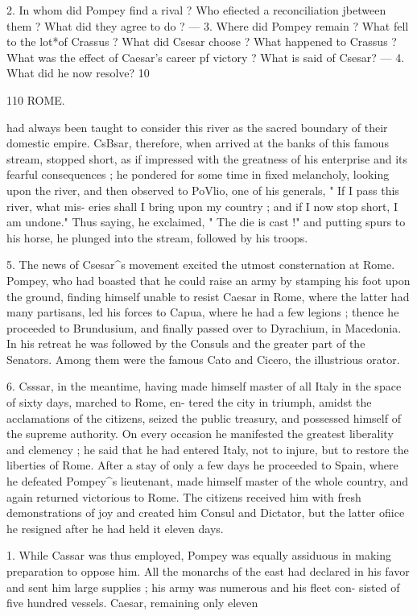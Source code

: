 \documentclass[openany,a4paper]{memoir}
\begin{document}
2. In whom did Pompey find a rival ? Who efiected a reconciliation 
jbetween them ? What did they agree to do ? — 3. Where did Pompey 
remain ? What fell to the lot*of Crassus ? What did Csesar choose ? 
What happened to Crassus ? What was the effect of Caesar's career 
pf victory ? What is said of Csesar? — 4. What did he now resolve? 
10 



110 ROME. 

had always been taught to consider this river as the sacred 
boundary of their domestic empire. CsBsar, therefore, when 
arrived at the banks of this famous stream, stopped short, as 
if impressed with the greatness of his enterprise and its 
fearful consequences ; he pondered for some time in fixed 
melancholy, looking upon the river, and then observed to 
PoVlio, one of his generals, " If I pass this river, what mis- 
eries shall I bring upon my country ; and if I now stop 
short, I am undone." Thus saying, he exclaimed, " The die 
is cast !" and putting spurs to his horse, he plunged into the 
stream, followed by his troops. 

5. The news of Csesar^s movement excited the utmost 
consternation at Rome. Pompey, who had boasted that he 
could raise an army by stamping his foot upon the ground, 
finding himself unable to resist Caesar in Rome, where the 
latter had many partisans, led his forces to Capua, where he 
had a few legions ; thence he proceeded to Brundusium, and 
finally passed over to Dyrachium, in Macedonia. In his 
retreat he was followed by the Consuls and the greater part 
of the Senators. Among them were the famous Cato and 
Cicero, the illustrious orator. 

6. Csssar, in the meantime, having made himself master 
of all Italy in the space of sixty days, marched to Rome, en- 
tered the city in triumph, amidst the acclamations of the 
citizens, seized the public treasury, and possessed himself of 
the supreme authority. On every occasion he manifested the 
greatest liberality and clemency ; he said that he had entered 
Italy, not to injure, but to restore the liberties of Rome. 
After a stay of only a few days he proceeded to Spain, 
where he defeated Pompey^s lieutenant, made himself master 
of the whole country, and again returned victorious to 
Rome. The citizens received him with fresh demonstrations 
of joy and created him Consul and Dictator, but the latter 
ofiice he resigned after he had held it eleven days. 

1. While Cassar was thus employed, Pompey was equally 
assiduous in making preparation to oppose him. All the 
monarchs of the east had declared in his favor and sent him 
large supplies ; his army was numerous and his fleet con- 
sisted of five hundred vessels. Caesar, remaining only eleven 
\end{document}
